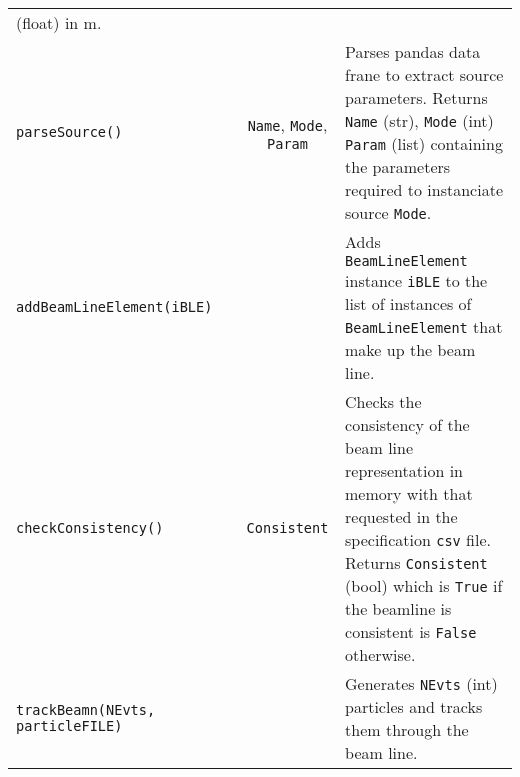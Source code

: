 \begin{sidewaystable}[h]
\begin{center}
\begin{tabular}{|l|c|c|p{10cm}|}
                                                                                 (float) in m.                                 \\
      \texttt{parseSource()}   &  & \texttt{Name}, \texttt{Mode}, \texttt{Param} & Parses pandas data frane to extract
                                                                                 source parameters.
                                                                                 Returns \texttt{Name} (str), \texttt{Mode} (int)
                                                                                 \texttt{Param} (list) containing the parameters
                                                                                 required to instanciate source \texttt{Mode}. \\
      \texttt{addBeamLineElement(iBLE)} &  &  & Adds \texttt{BeamLineElement} instance \texttt{iBLE} to the list of instances of
                                                     \texttt{BeamLineElement} that make up the beam line.                      \\
      \texttt{checkConsistency()} &  & \texttt{Consistent} & Checks the consistency of the beam line representation in memory
                                                             with that requested in the specification \texttt{csv} file.
                                                             Returns \texttt{Consistent} (bool) which is \texttt{True} if the
                                                             beamline is consistent is \texttt{False} otherwise.                     \\
      \texttt{trackBeamn(NEvts, particleFILE)} &  &  & Generates \texttt{NEvts} (int) particles and tracks them through the
                                                       beam line. \\
      \hline
    \end{tabular}
  \end{center}
\end{sidewaystable}

